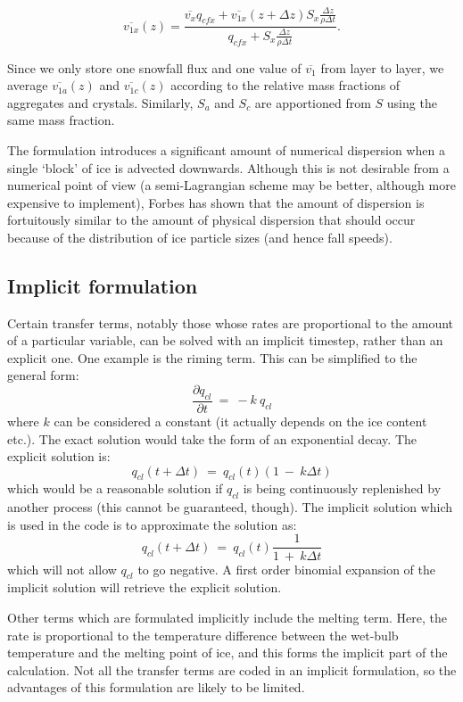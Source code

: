 \documentclass{UMDP_article}
\def\bq{\begin{equation}}
\def\eq{\end{equation}}
\begin{document}
\bq
\overline{v_{1x}}(z) = \frac{ \overline{v_{x}} q_{cfx} + 
\overline{v_{1x}}(z+\Delta z) S_x \frac{\Delta z}{\rho \Delta t} } {q_{cfx} + 
S_x \frac{\Delta z}{\rho \Delta t}  } .
\eq

Since we only store one snowfall flux and one value of $\overline{v_{1}}$ from
layer to layer, we average $\overline{v_{1a}}(z)$ and $\overline{v_{1c}}(z)$
according to the relative mass fractions of aggregates and crystals. Similarly,
$S_a$ and $S_c$ are apportioned from $S$ using the same mass fraction.

The formulation introduces a significant amount of numerical dispersion when
a single `block' of ice is advected downwards.
Although this is not desirable from a numerical point of view (a semi-Lagrangian
scheme may be better, although more expensive to implement), Forbes has
shown that the amount
of dispersion is fortuitously similar to the amount of physical dispersion that should
occur because of the distribution of ice particle sizes (and hence fall
speeds).

\subsection{Implicit formulation}
\label{sec:proc_rate_implicit}

Certain transfer terms, notably those whose rates are proportional to the
amount of a particular variable, can be solved with an implicit timestep,
rather than an explicit one. One example is the riming term. This can be
simplified to the general form:
\bq
\frac{\partial q_{cl}}{\partial t} ~=~ - k~q_{cl}
\eq
where $k$ can be considered a constant (it actually depends on the ice content etc.).
The exact solution would take the form of an exponential decay.
The explicit solution is:
\bq
q_{cl} (t+\Delta t) ~=~ q_{cl} (t)( 1~-~ k \Delta t)
\eq
which would be a reasonable solution if $q_{cl}$ is being continuously replenished
by another process (this cannot be guaranteed, though). The implicit solution
which is used in the code is to approximate the solution as:
\bq
q_{cl} (t+\Delta t) ~=~ q_{cl} (t) \frac{1}{1 ~+~ k \Delta t}
\eq
which will not allow $q_{cl}$ to go negative. A first order binomial expansion
of the implicit solution will retrieve the explicit solution.

Other terms
which are formulated implicitly include the melting term. Here, the rate
is proportional to the temperature difference between the wet-bulb temperature and
the melting point of ice, and this forms the implicit part of the
calculation. Not all the transfer terms are coded in an implicit formulation, so
the advantages of this formulation are likely to be limited.
\end{document}
